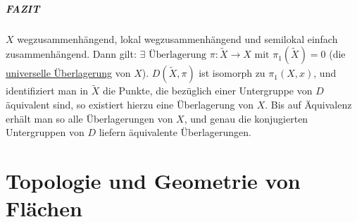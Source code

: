 \documentclass[a4paper,11pt,notitlepage]{report}
\theoremstyle{definition}
\begin{document}
\paragraph{FAZIT} $X$ wegzusammenhängend, lokal wegzusammenhängend und semilokal einfach zusammenhängend. Dann gilt: 
\newline
$\exists \text{ Überlagerung } \pi \colon \widetilde{X} \rightarrow X \text{ mit } \pi_1(\widetilde{X}) = 0$ (die \underline{universelle Überlagerung} von $X$). $D(\widetilde{X},\pi)$ ist isomorph zu $\pi_1(X,x)$, und identifiziert man in $\widetilde{X}$ die Punkte, die bezüglich einer Untergruppe von $D$ äquivalent sind, so existiert hierzu eine Überlagerung von $X$. Bis auf Äquivalenz erhält man so alle Überlagerungen von $X$, und genau die konjugierten Untergruppen von $D$ liefern äquivalente Überlagerungen.

\chapter{Topologie und Geometrie von Flächen}
\end{document}
